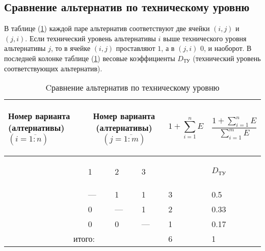 \subsection{Сравнение альтернатив по техническому уровню}
В таблице (\ref{technical_lvl_comparison_table}) каждой паре альтернатив
соответствуют две ячейки $(i, j)$ и $(j, i)$.
Если технический уровень альтернативы $i$ выше технического уровня альтернативы
$j$, то в ячейке $(i, j)$ проставляют $1$, а в $(j, i)$ $0$, и наоборот.
В последней колонке таблице (\ref{technical_lvl_comparison_table}) весовые
коэффициенты $D_{\text{ТУ}}$ (технический уровень соответствующих альтернатив).
\begin{table}[h!]
    \centering
    \begin{tabular}{|p{2.4cm}|p{2cm}|p{2cm}|p{2cm}|p{2cm}|p{2cm}|}
        \hline
        \begin{center} Номер варианта (алтернативы) $(i = \overline{1:n})$ \end{center} &
        \multicolumn{3}{c|}{
            \parbox{2.4cm}{
                \centering
                Номер варианта (алтернативы) $(j = \overline{1:m})$
            }
        } &
        \begin{center} $$1 + \sum_{i=1}^n E$$ \end{center} &
        \begin{center} $$\frac{1 + \sum_{i=1}^n E}{\sum_{i=1}^m E}$$ \end{center} \\

        \hline &
        \begin{center} 1 \end{center} &
        \begin{center} 2 \end{center} &
        \begin{center} 3 \end{center} &
        &
        \begin{center} $D_\text{ТУ}$ \end{center}\\

        \hline
        \centering{1} & --- &  1  &  1  & 3 & 0.5  \\ \hline
        \centering{2} &  0  & --- &  1  & 2 & 0.33 \\ \hline
        \centering{3} &  0  &  0  & --- & 1 & 0.17 \\ \hline

        \hline
        \multicolumn{4}{|c|}{итого:} & 6 & 1 \\
        \hline
    \end{tabular}
    \caption{Cравнение альтернатив по техническому уровню}
    \label{technical_lvl_comparison_table}
\end{table}


